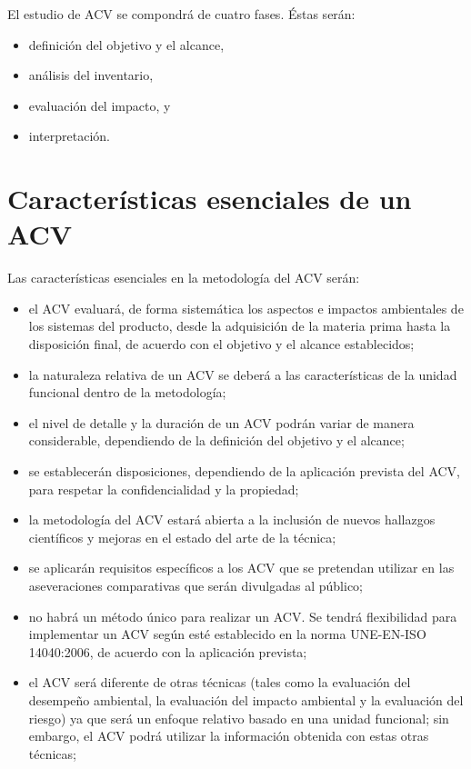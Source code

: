 El estudio de ACV se compondrá de cuatro fases. Éstas serán:
\begin{itemize}
  \item definición del objetivo y el alcance,
  \item análisis del inventario,
  \item evaluación del impacto, y
  \item interpretación.
\end{itemize}

\section{Características esenciales de un ACV}

Las características esenciales en la metodología del ACV serán:
\begin{itemize}
  \item el ACV evaluará, de forma sistemática los aspectos e impactos ambientales de los sistemas del producto, desde la adquisición de la materia prima hasta la disposición final, de acuerdo con el objetivo y el alcance establecidos;
  \item la naturaleza relativa de un ACV se deberá a las características de la unidad funcional dentro de la metodología;
  \item el nivel de detalle y la duración de un ACV podrán variar de manera considerable, dependiendo de la definición del objetivo y el alcance;
  \item se establecerán disposiciones, dependiendo de la aplicación prevista del ACV, para respetar la confidencialidad y la propiedad;
  \item la metodología del ACV estará abierta a la inclusión de nuevos hallazgos científicos y mejoras en el estado del arte de la técnica;
  \item se aplicarán requisitos específicos a los ACV que se pretendan utilizar en las aseveraciones comparativas que serán divulgadas al público;
  \item no habrá un método único para realizar un ACV. Se tendrá flexibilidad para implementar un ACV según esté establecido en la norma UNE-EN-ISO 14040:2006, de acuerdo con la aplicación prevista;
  \item el ACV será diferente de otras técnicas (tales como la evaluación del desempeño ambiental, la evaluación del impacto ambiental y la evaluación del riesgo) ya que será un enfoque relativo basado en una unidad funcional; sin embargo, el ACV podrá utilizar la información obtenida con estas otras técnicas;

\end{itemize}
